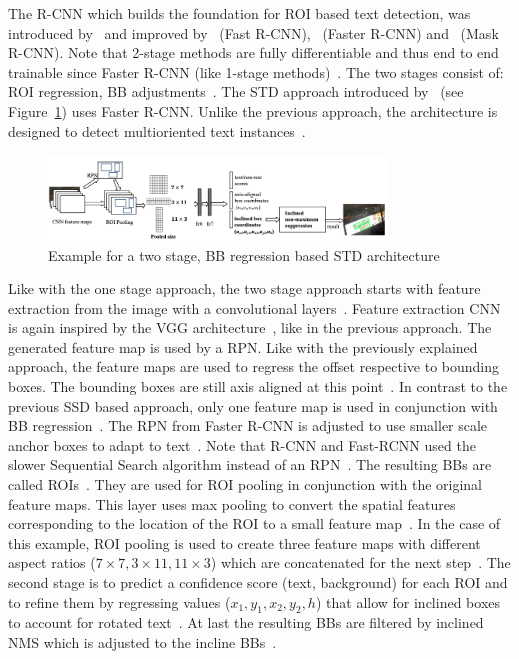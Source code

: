 The R-CNN which builds the foundation for \ac{ROI} based text detection, was introduced
by~\cite{girshick_rich_2014} and improved by~\cite{girshick_fast_2015} (Fast
R-CNN),~\cite{ren_faster_2015} (Faster R-CNN) and~\cite{he_mask_2018} (Mask R-CNN).
Note that 2-stage methods are fully differentiable and thus end to end trainable since
Faster R-CNN (like 1-stage methods)~\citep{ren_faster_2015,long_scene_2021}.
The two stages consist of: \ac{ROI} regression, \ac{BB}
adjustments~\citep{jiang_r2cnn_2017, ren_faster_2015}.
The \ac{STD} approach introduced by~\cite{jiang_r2cnn_2017} (see Figure~\ref{fig:STD-segfree-rcnn})
uses Faster R-CNN.%
Unlike the previous approach, the architecture is designed to detect multioriented text
instances~\citep{jiang_r2cnn_2017,liao_textboxes_2017}.
\begin{figure}[ht]
    \centering
    \includegraphics[width=0.8\textwidth]{img/STD-seg-free-Jiang-R2CNN-2017.png}
    \caption[Two stage, BB regression based STD architecture]{%
        Example for a two stage, BB regression based STD
        architecture~\citep{jiang_r2cnn_2017}\label{fig:STD-segfree-rcnn}
    }
\end{figure}
Like with the one stage approach, the two stage approach starts with feature extraction from the
image with a convolutional layers~\citep{jiang_r2cnn_2017}.
Feature extraction \ac{CNN} is again inspired by the VGG architecture~\citep{jiang_r2cnn_2017},
like in the previous approach.
The generated feature map is used by a \ac{RPN}.
Like with the previously explained approach, the feature maps are used to regress the offset
respective to bounding boxes.
The bounding boxes are still axis aligned at this point~\citep{jiang_r2cnn_2017}.
In contrast to the previous SSD based approach, only one feature map is used in conjunction with
\ac{BB} regression~\citep{jiang_r2cnn_2017}.
The \ac{RPN} from Faster R-CNN is adjusted to use smaller scale anchor boxes to adapt to
text~\citep{jiang_r2cnn_2017}.
Note that R-CNN and Fast-RCNN used the slower Sequential Search algorithm instead of an
\ac{RPN}~\citep{girshick_rich_2014,girshick_fast_2015}.
The resulting \acp{BB} are called \acp{ROI}~\citep{ren_faster_2015,jiang_r2cnn_2017}.
They are used for \ac{ROI} pooling in conjunction with the original feature maps.
This layer uses max pooling to convert the spatial features corresponding to the location of the
\ac{ROI} to a small feature map~\citep{girshick_fast_2015}.
In the case of this example, \ac{ROI} pooling is used to create three feature maps with different
aspect ratios ($7\times7, 3\times11, 11\times3$) which are concatenated for the next
step~\citep{jiang_r2cnn_2017}.
The second stage is to predict a confidence score (text, background) for each \ac{ROI} and to
refine them by regressing values ($x_1,y_1,x_2,y_2,h$) that allow for inclined boxes to account for
rotated text~\citep{jiang_r2cnn_2017}.
At last the resulting \acp{BB} are filtered by inclined \ac{NMS} which is adjusted to the
incline \acp{BB}~\citep{jiang_r2cnn_2017}.

